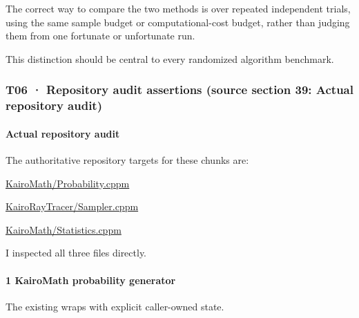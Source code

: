 The correct way to compare the two methods is over repeated independent trials, using the same sample budget or computational-cost budget, rather than judging them from one fortunate or unfortunate run.

This distinction should be central to every randomized algorithm benchmark.

\subsubsection{T06 · Repository audit assertions (source section 39: Actual repository audit)}\label{02-foundations-ii-ch039-t06-repository-audit-assertions-source-section-39-actual-repository-audit}

\hypertarget{02-foundations-ii-ch039-t06-repository-audit-assertions-source-section-39-actual-repository-audit}{}

\paragraph{Actual repository audit}\label{02-foundations-ii-ch039-actual-repository-audit}

\hypertarget{02-foundations-ii-ch039-actual-repository-audit}{}

The authoritative repository targets for these chunks are:

\href{https://github.com/swayam8624/KairoMath/blob/master/Probability.cppm?utm_source=chatgpt.com}{KairoMath/Probability.cppm}

\href{https://github.com/swayam8624/KairoRayTracer/blob/main/Sampler.cppm?utm_source=chatgpt.com}{KairoRayTracer/Sampler.cppm}

\href{https://github.com/swayam8624/KairoMath/blob/master/Statistics.cppm?utm_source=chatgpt.com}{KairoMath/Statistics.cppm}

I inspected all three files directly.

\paragraph{1 KairoMath probability generator}\label{02-foundations-ii-ch039-kairomath-probability-generator}

\hypertarget{02-foundations-ii-ch039-kairomath-probability-generator}{}

The existing  wraps  with explicit caller-owned state.

